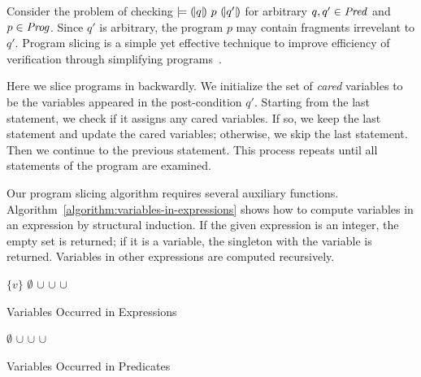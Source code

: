 
Consider the problem of checking $\models {(\!|}{q}{|\!)}~{p}~{(\!|}{q'}{|\!)}$ for
arbitrary $q, q' \in \mathit{Pred}$ and $p \in \mathit{Prog}$. Since $q'$ is arbitrary, the
program $p$ may contain fragments irrevelant to $q'$. Program slicing
is a simple yet effective technique to improve efficiency of
verification through simplifying programs~\cite{W:81:PS}.

Here we slice programs in backwardly. We initialize the set
of \emph{cared} variables to be the variables appeared in the
post-condition $q'$. Starting from the last statement, we check if
it assigns any cared variables. If so, we keep the last
statement and update the cared variables; otherwise, we skip the last
statement. Then we continue to the previous statement.
This process repeats until all statements of the
program are examined.

Our program slicing algorithm requires several auxiliary functions. 
Algorithm~\ref{algorithm:variables-in-expressions} shows how to
compute variables in an expression by structural
induction. If the given expression is an integer,
the empty set is returned; if it is a variable, the singleton with the
variable is returned. Variables in other expressions are computed
recursively. 

\begin{algorithm}
  \begin{algorithmic}[1]
        \Return $\{ v \}$
      \EndCase
        \Return $\emptyset$
      \EndCase
        \Return {}
      \EndCase
        \Return {} $\cup$ 
      \EndCase
        \Return {} $\cup$ 
      \EndCase
        \Return {} $\cup$ 
      \EndCase
        \Return {}
      \EndCase
    \EndMatch
    \EndFunction
  \end{algorithmic}
  \caption{Variables Occurred in Expressions}
  \label{algorithm:variables-in-expressions}
\end{algorithm}

\begin{algorithm}
\begin{algorithmic}[1]
    \Case{$\top$}
      \Return $\emptyset$
    \EndCase
      \Return {} $\cup$ 
    \EndCase
      \Return {} $\cup$ 
    \EndCase
      \Return {} $\cup$ 
    \EndCase
  \EndMatch
  \EndFunction
\end{algorithmic}
\caption{Variables Occurred in Predicates}
\label{algorithm:variables-in-predicates}
\end{algorithm}

